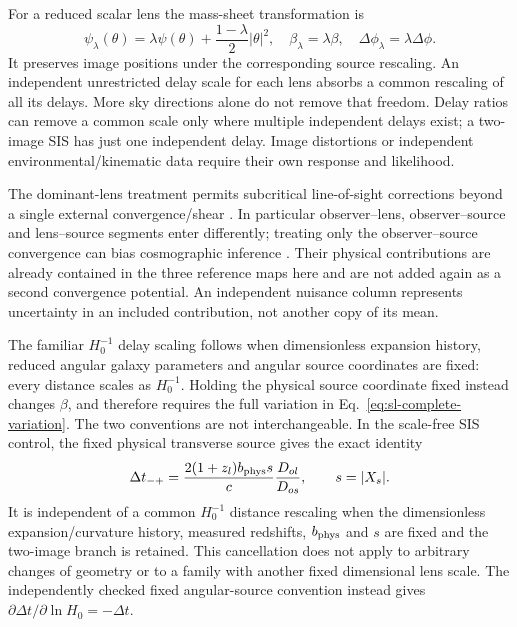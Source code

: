 For a reduced scalar lens the mass-sheet transformation is
\begin{equation}
 \psi_\lambda(\theta)=\lambda\psi(\theta)
 +\frac{1-\lambda}{2}|\theta|^2,
 \quad \beta_\lambda=\lambda\beta,
 \quad \Delta\phi_\lambda=\lambda\Delta\phi.
 \label{eq:sl-mst}
\end{equation}
It preserves image positions under the corresponding source rescaling.
An independent unrestricted delay scale for each lens absorbs a common
rescaling of all its delays. More sky directions alone do not remove
that freedom. Delay ratios can remove a common scale only where multiple
independent delays exist; a two-image SIS has just one independent delay.
Image distortions or independent environmental/kinematic data require
their own response and likelihood.

The dominant-lens treatment permits subcritical line-of-sight corrections
beyond a single external convergence/shear
\citep{Fleury2021los}. In particular observer--lens, observer--source and
lens--source segments enter differently; treating only the observer--source
convergence can bias cosmographic inference
\citep{Teodori2022}. Their physical contributions are already contained in
the three reference maps here and are not added again as a second
convergence potential. An independent nuisance column represents uncertainty
in an included contribution, not another copy of its mean.

The familiar $H_0^{-1}$ delay scaling follows when dimensionless expansion
history, reduced angular galaxy parameters and angular source coordinates
are fixed: every distance scales as $H_0^{-1}$. Holding the physical source
coordinate fixed instead changes $\beta$, and therefore requires the full
variation in Eq.~\eqref{eq:sl-complete-variation}. The two conventions are
not interchangeable.
In the scale-free SIS control, the fixed physical transverse source gives
the exact identity
\begin{equation}
 \Delta t_{-+}=\frac{2(1+z_l)b_{\rm phys}s}{c}
 \frac{D_{ol}}{D_{os}},\qquad s=|X_s|.
 \label{eq:sl-fixed-source-delay}
\end{equation}
It is independent of a common $H_0^{-1}$ distance rescaling when the
dimensionless expansion/curvature history, measured redshifts,
$b_{\rm phys}$ and $s$ are fixed and the two-image branch is retained.
This cancellation does not apply to arbitrary changes of geometry or to
a family with another fixed dimensional lens scale.
The independently checked fixed angular-source convention instead gives
$\partial\Delta t/\partial\ln H_0=-\Delta t$.

